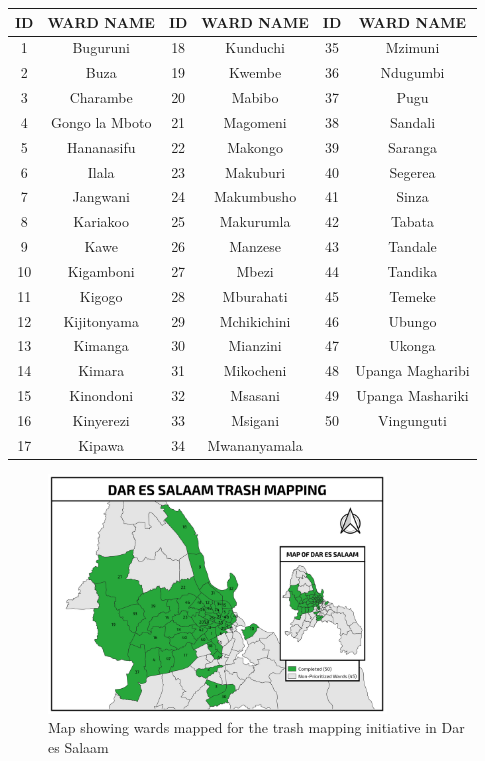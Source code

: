 \documentclass[a4paper,12pt,twoside]{article}
\begin{document}
\begin{center}
\begin{tabular}{|c|c|c|c|c|c|}
\hline
ID & WARD NAME & ID & WARD NAME & ID & WARD NAME\\
\hline
1 & Buguruni & 18 & Kunduchi & 35 & Mzimuni\\
2 & Buza & 19 & Kwembe & 36 & Ndugumbi\\
3 & Charambe & 20 & Mabibo & 37 & Pugu\\
4 & Gongo la Mboto & 21 & Magomeni & 38 & Sandali\\
5 & Hananasifu & 22 & Makongo & 39 & Saranga\\
6 & Ilala & 23 & Makuburi & 40 & Segerea\\
7 & Jangwani & 24 & Makumbusho & 41 & Sinza\\
8 & Kariakoo & 25 & Makurumla & 42 & Tabata\\
9 & Kawe & 26 & Manzese & 43 & Tandale\\
10 & Kigamboni & 27 & Mbezi & 44 & Tandika\\
11 & Kigogo & 28 & Mburahati & 45 & Temeke\\
12 & Kijitonyama & 29 & Mchikichini & 46 & Ubungo\\
13 & Kimanga & 30 & Mianzini & 47 & Ukonga\\
14 & Kimara & 31 & Mikocheni & 48 & Upanga Magharibi\\
15 & Kinondoni & 32 & Msasani & 49 & Upanga Mashariki\\
16 & Kinyerezi & 33 & Msigani & 50 & Vingunguti\\
17 & Kipawa & 34 & Mwananyamala & {} & {}\\
 \hline
\end{tabular}
\end{center}

\begin{figure}[h]
  \caption{Map showing wards mapped for the trash mapping initiative in Dar es Salaam}
  \centering
 \includegraphics[width=0.8\textwidth]{images/Dar_Trash_Map.png}
\end{figure}
\end{document}
